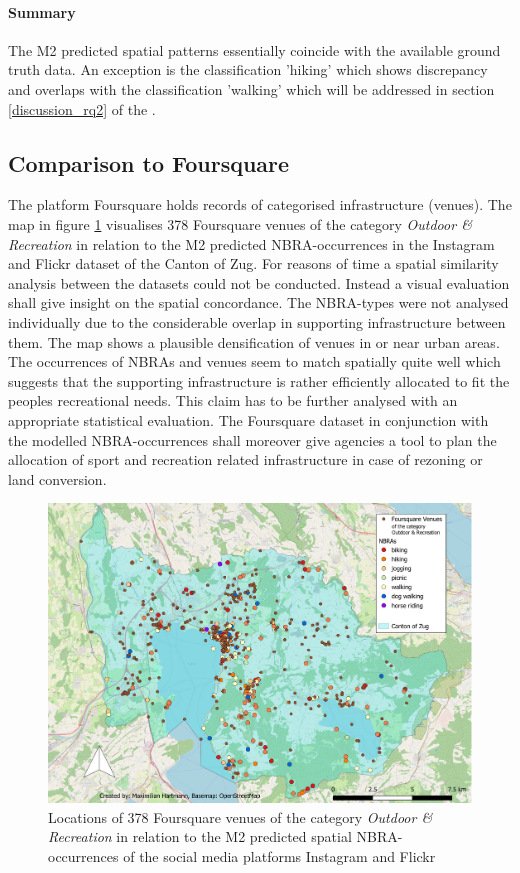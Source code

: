 \paragraph*{Summary}
The M2 predicted spatial patterns essentially coincide with the available ground truth data. An exception is the classification 'hiking' which shows discrepancy and overlaps with the classification 'walking' which will be addressed in section \ref{discussion_rq2} of the .

\subsection{Comparison to Foursquare}
The platform Foursquare holds records of categorised infrastructure (venues). The map in figure \ref{fig:map_foursquare_comparison} visualises 378 Foursquare venues of the category \textit{Outdoor \& Recreation} in relation to the M2 predicted NBRA-occurrences in the Instagram and Flickr dataset of the Canton of Zug. For reasons of time a spatial similarity analysis between the datasets could not be conducted. Instead a visual evaluation shall give insight on the spatial concordance. The NBRA-types were not analysed individually due to the considerable overlap in supporting infrastructure between them. The map shows a plausible densification of venues in or near urban areas. The occurrences of NBRAs and venues seem to match spatially quite well which suggests that the supporting infrastructure is rather efficiently allocated to fit the peoples recreational needs. This claim has to be further analysed with an appropriate statistical evaluation. The Foursquare dataset in conjunction with the modelled NBRA-occurrences shall moreover give agencies a tool to plan the allocation of sport and recreation related infrastructure in case of rezoning or land conversion.

\begin{figure}[!htb]
   \centering
   \includegraphics[width=\textwidth,height=\textheight,keepaspectratio]{img/foursquare_comparison_cropped.pdf}
   \caption{Locations of 378 Foursquare venues of the category \textit{Outdoor \& Recreation} in relation to the M2 predicted spatial NBRA-occurrences of the social media platforms Instagram and Flickr}
   \label{fig:map_foursquare_comparison}
\end{figure}


